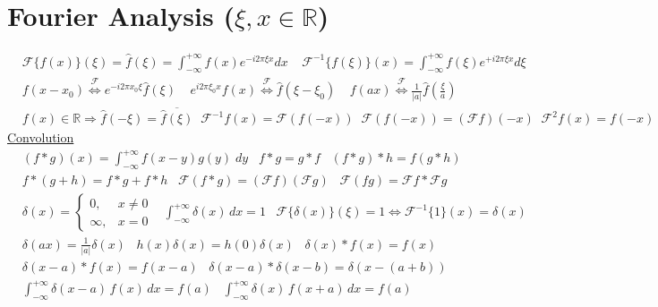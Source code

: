 \section*{Fourier Analysis{\normalfont\scriptsize \; ($\xi, x\in \mathbb{R}$)}}
\begin{align*}
&\mathcal{F}\{f(x)\}(\xi) \!=\!\hat f(\xi) \!= \!\int_{-\infty}^{+\infty}\!f(x)e^{-i 2\pi \xi x}  dx \; \;\; \; \mathcal{F}^{-1}\{f(\xi)\}(x) = \int_{-\infty}^{+\infty}\! f(\xi)e^{+i2\pi\xi x}d\xi \\
&f(x-x_0)\stackrel{\mathcal{F}}{\Longleftrightarrow} e^{-i2\pi x_0\xi} \hat f(\xi)\; \; \;\;  e^{i2\pi\xi_0 x}f(x) \stackrel{\mathcal{F}}{\Longleftrightarrow} \hat{f}(\xi-\xi_0)\; \; \; \; f(ax) \stackrel{\mathcal{F}}{\Longleftrightarrow}\frac{1}{|a|}\hat{f}\left( \frac{\xi}{a}\right)\\
&f(x)\!\in\! \mathbb{R}\!\Rightarrow \!\hat{f}(-\xi)\!=\! \overline{\hat{f}(\xi)} \; \; \mathcal{F}^{-\!1}\!f(x) \!=\! \mathcal{F}(f(-x)\!) \;\; \mathcal{F}(f(-x)\!)\!=\!(\mathcal{F}f)(-x)\; \; \mathcal{F}^2\!f(x)\!=\!f(-x)
\end{align*}
\underline{Convolution}
\begin{align*}
    &(f*g)(x)= \int_{-\infty}^{+\infty}f(x-y)g(y)\;\!dy \; \; \; f*g = g*f \; \; \; (f*g)*h=f(g*h) \\
    &f*(g+h)=f*g+f*h \; \; \;  \mathcal{F}(f*g)=(\mathcal{F}f)(\mathcal{F}g)\; \; \;  \mathcal{F}(fg)= \mathcal{F}f*\mathcal{F}g
\end{align*}
\underline{}
\begin{align*}
&\delta(x) = \begin{cases}
0, & x \ne 0 \\
\infty, & x = 0
\end{cases}\;\;\;
\int_{-\infty}^{+\infty} \delta(x) \, dx = 1 \; \; \; \mathcal{F}\{\delta(x)\}(\xi) = 1\Leftrightarrow \mathcal{F}^{-1}\{1\}(x)=\delta(x)\\
&\delta(ax) = \frac{1}{|a|} \delta(x) \; \; \;
h(x) \delta(x) = h(0) \delta(x) \; \; \; 
\delta(x) * f(x) = f(x) \\&    \delta(x - a) * f(x) = f(x - a)\; \; \;\delta(x - a) * \delta(x - b) = \delta(x - (a + b))\\
& \int_{-\infty}^{+\infty} \delta(x - a)\, f(x)\, dx = f(a) \; \; \; 
 \int_{-\infty}^{+\infty} \delta(x)\, f(x + a)\, dx = f(a)
\end{align*}

